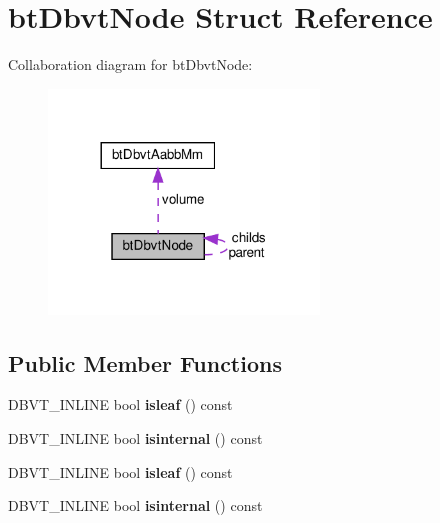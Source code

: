 \hypertarget{structbtDbvtNode}{}\section{bt\+Dbvt\+Node Struct Reference}
\label{structbtDbvtNode}


Collaboration diagram for bt\+Dbvt\+Node\+:
\nopagebreak
\begin{figure}[H]
\begin{center}
\leavevmode
\includegraphics[width=204pt]{structbtDbvtNode__coll__graph}
\end{center}
\end{figure}
\subsection*{Public Member Functions}
\begin{DoxyCompactItemize}
\item 
\mbox{\label{structbtDbvtNode_aec66ecba6efea4ee434a21fa60e1eb40}} 
D\+B\+V\+T\+\_\+\+I\+N\+L\+I\+NE bool {\bfseries isleaf} () const
\item 
\mbox{\label{structbtDbvtNode_a40851e7039378fc42ff3285e5c1f8969}} 
D\+B\+V\+T\+\_\+\+I\+N\+L\+I\+NE bool {\bfseries isinternal} () const
\item 
\mbox{\label{structbtDbvtNode_aec66ecba6efea4ee434a21fa60e1eb40}} 
D\+B\+V\+T\+\_\+\+I\+N\+L\+I\+NE bool {\bfseries isleaf} () const
\item 
\mbox{\label{structbtDbvtNode_a40851e7039378fc42ff3285e5c1f8969}} 
D\+B\+V\+T\+\_\+\+I\+N\+L\+I\+NE bool {\bfseries isinternal} () const
\end{DoxyCompactItemize}
